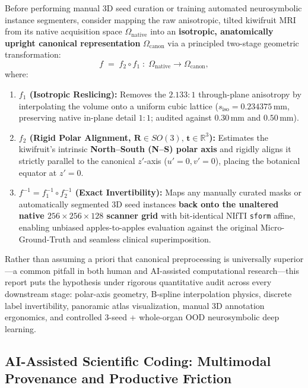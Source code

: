 \documentclass[10pt,a4paper]{article}
\renewcommand{\_}{\origunderscore\allowbreak}
\begin{document}
\begin{didacticbox}[Core Transformation Hypothesis ($f = f_2 \circ f_1$ and Invertibility $f^{-1}$)]
Before performing manual 3D seed curation or training automated neurosymbolic instance segmenters, consider mapping the raw anisotropic, tilted kiwifruit MRI from its native acquisition space $\Omega_{\text{native}}$ into an \textbf{isotropic, anatomically upright canonical representation} $\Omega_{\text{canon}}$ via a principled two-stage geometric transformation:
\[
    f \;=\; f_2 \circ f_1 \;:\; \Omega_{\text{native}} \longrightarrow \Omega_{\text{canon}},
\]
where:
\begin{enumerate}[itemsep=1.5pt, topsep=2pt]
    \item \textbf{$f_1$ (Isotropic Reslicing):} Removes the $2.133:1$ through-plane anisotropy by interpolating the volume onto a uniform cubic lattice ($s_{\text{iso}} = 0.234375\,\text{mm}$, preserving native in-plane detail $1:1$; audited against $0.30\,\text{mm}$ and $0.50\,\text{mm}$).
    \item \textbf{$f_2$ (Rigid Polar Alignment, $\mathbf{R} \in SO(3),\,\mathbf{t}\in\mathbb{R}^3$):} Estimates the kiwifruit's intrinsic \textbf{North--South (N--S) polar axis} and rigidly aligns it strictly parallel to the canonical $z'$-axis ($u'=0, v'=0$), placing the botanical equator at $z'=0$.
    \item \textbf{$f^{-1} = f_1^{-1} \circ f_2^{-1}$ (Exact Invertibility):} Maps any manually curated masks or automatically segmented 3D seed instances \textbf{back onto the unaltered native $256\times 256\times 128$ scanner grid} with bit-identical NIfTI \texttt{sform} affine, enabling unbiased apples-to-apples evaluation against the original Micro-Ground-Truth and seamless clinical superimposition.
\end{enumerate}
\end{didacticbox}

Rather than assuming a priori that canonical preprocessing is universally superior---a common pitfall in both human and AI-assisted computational research---this report puts the hypothesis under rigorous quantitative audit across every downstream stage: polar-axis geometry, B-spline interpolation physics, discrete label invertibility, panoramic atlas visualization, manual 3D annotation ergonomics, and controlled 3-seed + whole-organ OOD neurosymbolic deep learning.

\subsection{AI-Assisted Scientific Coding: Multimodal Provenance and Productive Friction}
\label{sec:intro_ai}
\end{document}
